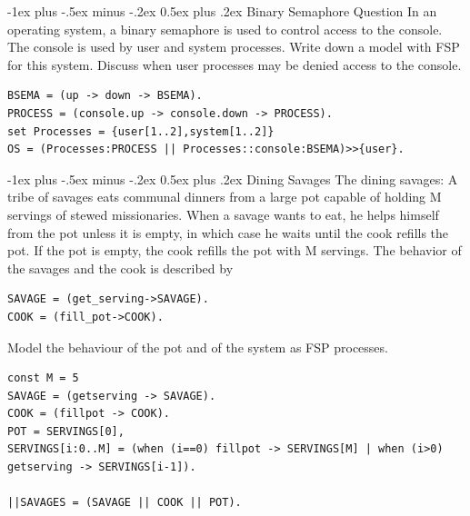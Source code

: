 \documentclass[letterpaper, 8pt]{extarticle}
\makeatletter
\renewcommand{\section}{\@startsection{section}{1}{0mm}%
                                {-1ex plus -.5ex minus -.2ex}%
                                {0.5ex plus .2ex}%
                                {\normalfont\normalsize\bfseries}}
\makeatother
\begin{document}
\begin{multicols*}{5}
\section{Binary Semaphore Question}
In an operating system, a binary semaphore is used to control access to the console. The console is used by user and system processes. Write down a model with FSP for this system. Discuss when user processes may be denied access to the console.
\begin{lstlisting}
BSEMA = (up -> down -> BSEMA).
PROCESS = (console.up -> console.down -> PROCESS).
set Processes = {user[1..2],system[1..2]}
OS = (Processes:PROCESS || Processes::console:BSEMA)>>{user}.
\end{lstlisting}

\section{Dining Savages}
The dining savages: A tribe of savages eats communal dinners from a large pot capable of holding M servings of stewed missionaries. When a savage wants to eat, he helps himself from the pot unless it is empty, in which case he waits until the cook refills the pot. If the pot is empty, the cook refills the pot with M servings. The behavior of the savages and the cook is described by
\begin{lstlisting}
SAVAGE = (get_serving->SAVAGE).
COOK = (fill_pot->COOK).
\end{lstlisting}
Model the behaviour of the pot and of the system as FSP processes.
\begin{lstlisting}
const M = 5
SAVAGE = (getserving -> SAVAGE).
COOK = (fillpot -> COOK).
POT = SERVINGS[0],
SERVINGS[i:0..M] = (when (i==0) fillpot -> SERVINGS[M] | when (i>0) getserving -> SERVINGS[i-1]).

||SAVAGES = (SAVAGE || COOK || POT).
\end{lstlisting}


\end{multicols*}
\end{document}
